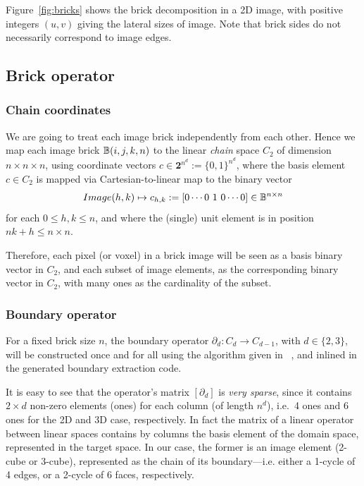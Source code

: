 Figure~\ref{fig:bricks} shows the brick decomposition in a 2D image, with positive integers $(u,v)$ giving the lateral sizes of image. Note that brick sides do not necessarily correspond to image edges. 


\subsection{Brick operator }\label{sec:brick}

\subsubsection*{Chain coordinates }\label{sec:chain-coords}
We are going to treat each image brick independently from each other. Hence we map each image brick $\mathbb{B}(i,j,k,n)$ to the linear \emph{chain} space $C_2$ of dimension $n\times n\times n$, using coordinate vectors $c\in \mathbf{2}^{n^d} := \{0,1\}^{n^d}$, where the basis element $c \in C_2$ is mapped via Cartesian-to-linear map to the binary vector 
\[
Image(h,k) \mapsto c_{h,k} := [0 \cdots 0\ 1\ 0 \cdots 0] \in \mathbb{B}^{n\times n}
\]
for each $0\leq h,k \leq n$, and where the (single) unit element is in position $nk + h \leq n\times n$.

Therefore, each pixel (or voxel) in a brick image will be seen as a basis binary vector in $C_2$, and each subset of image elements, as the corresponding binary vector in $C_2$, with many ones as the cardinality of the subset.

\subsubsection*{Boundary operator }\label{sec:boundary-operator}
For a fixed brick size $n$, the boundary operator $\partial_d : C_d\to C_{d-1}$, with $d\in\{2,3\}$, will be constructed once and for all using the algorithm given in~
\cite{TSAS}, 
and inlined in the generated boundary extraction code.

It is easy to see that the operator's matrix $[\partial_d]$ is \emph{very sparse}, since it contains $2\times d$ non-zero elements (ones) for each column (of length $n^d$), i.e.~4 ones and 6 ones for the 2D and 3D case, respectively. In fact the matrix of a linear operator between linear spaces contains by columns the basis element of the domain space, represented in the target space. In our case, the former is an image element (2-cube or 3-cube), represented as the chain of its boundary---i.e. either a 1-cycle of 4 edges, or  a 2-cycle of 6 faces, respectively.  

